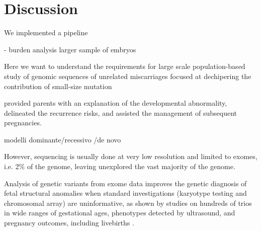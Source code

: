 \section*{Discussion}
We implemented a pipeline 








- burden analysis larger sample of embryos 



Here we want to understand the requirements for large scale population-based study of genomic sequences of unrelated miscarriages focused at dechipering the contribution of small-size mutation 

provided parents with an explanation of the developmental abnormality, delineated the recurrence risks, and assisted the management of subsequent pregnancies.



modelli dominante/recessivo /de novo 


 However, sequencing is usually done at very low resolution and limited to exomes, i.e. 2\% of the genome, leaving unexplored the vast majority of the genome. 
 
 
Analysis of genetic variants from exome data improves the genetic diagnosis of fetal structural anomalies when standard investigations (karyotype testing and chromosomal array) are uninformative, as shown by studies on hundreds of trios in wide ranges of gestational ages, phenotypes detected by ultrasound, and pregnancy outcomes, including livebirths \cite{petrovski2019whole, quinlan2019molecular, lord2019prenatal}. 



